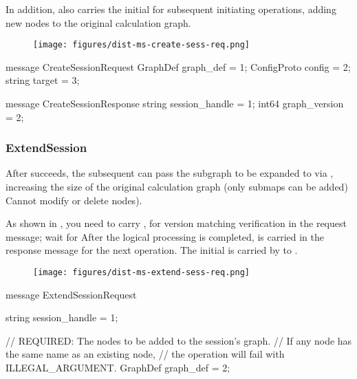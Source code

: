 \begin{content}
In addition,  also carries the initial  for subsequent initiating  operations, adding new nodes to the original calculation graph.

\begin{figure}[H]
\centering
\texttt{[image: figures/dist-ms-create-sess-req.png]}
\caption{}
 \label{fig:dist-ms-create-sess-req}
\end{figure}

\begin{leftbar}
\begin{c++}
message CreateSessionRequest {
  GraphDef graph_def = 1;
  ConfigProto config = 2;
  string target = 3;
}

message CreateSessionResponse {
  string session_handle = 1;
  int64 graph_version = 2;
}
\end{c++}
\end{leftbar}

\subsubsection{ExtendSession}

After  succeeds, the subsequent  can pass the subgraph to be expanded to  via , increasing the size of the original calculation graph (only submaps can be added) Cannot modify or delete nodes).

As shown in , you need to carry ,  for version matching verification in the request message; wait for  After the logical processing is completed,  is carried in the response message for the next  operation. The initial  is carried by  to .

\begin{figure}[H]
\centering
\texttt{[image: figures/dist-ms-extend-sess-req.png]}
\caption{}
 \label{fig:dist-ms-extend-sess-req}
\end{figure}

\begin{leftbar}
\begin{c++}
message ExtendSessionRequest {
  string session_handle = 1;

  // REQUIRED: The nodes to be added to the session's graph. 
  // If any node has the same name as an existing node, 
  // the operation will fail with ILLEGAL\_ARGUMENT.
  GraphDef graph_def = 2;

}
\end{c++}
\end{leftbar}
\end{content}
